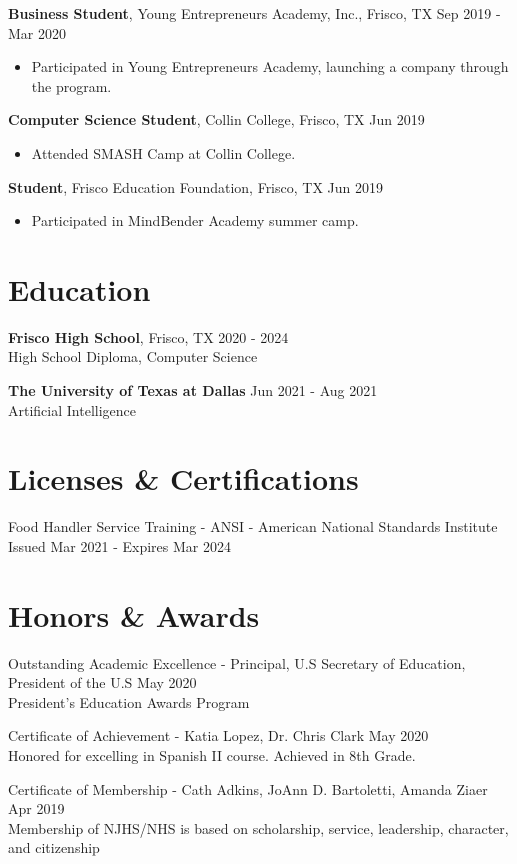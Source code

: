 \documentclass[a4paper, 10pt]{article}
\begin{document}
\vspace{12pt}

\textbf{Business Student}, Young Entrepreneurs Academy, Inc., Frisco, TX \hfill Sep 2019 - Mar 2020
\begin{itemize}[left=0pt, itemsep=0pt]
    \item Participated in Young Entrepreneurs Academy, launching a company through the program.
\end{itemize}

\vspace{12pt}

\textbf{Computer Science Student}, Collin College, Frisco, TX \hfill Jun 2019
\begin{itemize}[left=0pt, itemsep=0pt]
    \item Attended SMASH Camp at Collin College.
\end{itemize}

\vspace{12pt}

\textbf{Student}, Frisco Education Foundation, Frisco, TX \hfill Jun 2019
\begin{itemize}[left=0pt, itemsep=0pt]
    \item Participated in MindBender Academy summer camp.
\end{itemize}

\section*{Education}
\textbf{Frisco High School}, Frisco, TX \hfill 2020 - 2024 \\
High School Diploma, Computer Science

\textbf{The University of Texas at Dallas} \hfill Jun 2021 - Aug 2021 \\
Artificial Intelligence

\section*{Licenses \& Certifications}
Food Handler Service Training - ANSI - American National Standards Institute \hfill Issued Mar 2021 - Expires Mar 2024

\section*{Honors \& Awards}
Outstanding Academic Excellence - Principal, U.S Secretary of Education, President of the U.S \hfill May 2020 \\
President's Education Awards Program

Certificate of Achievement - Katia Lopez, Dr. Chris Clark \hfill May 2020 \\
Honored for excelling in Spanish II course. Achieved in 8th Grade.

Certificate of Membership - Cath Adkins, JoAnn D. Bartoletti, Amanda Ziaer \hfill Apr 2019 \\
Membership of NJHS/NHS is based on scholarship, service, leadership, character, and citizenship
\end{document}
